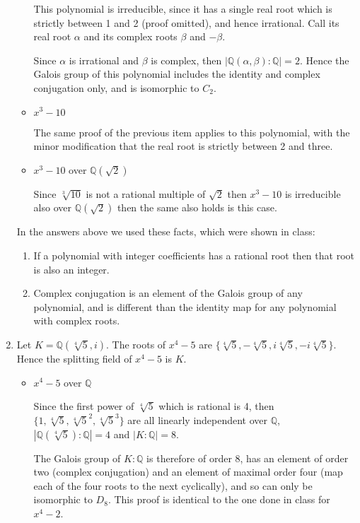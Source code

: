 \documentclass[11pt]{article} \usepackage{amssymb}
\newcommand{\Q}{\mathbb Q}
\begin{document}
\begin{enumerate}
\begin{itemize}
      This polynomial is irreducible, since it has a single real root which
      is strictly between 1 and 2 (proof omitted), and hence irrational. 
      Call its real root
      $\alpha$ and its complex roots $\beta$ and $-\beta$. 

      Since $\alpha$ is irrational and $\beta$ is complex, then 
      $|\Q(\alpha,\beta):\Q|=2$. Hence the Galois group of this polynomial
      includes the identity and complex conjugation only, and is isomorphic
      to $C_2$.
      
    \item $x^3-10$
      
      The same proof of the previous item applies to this polynomial, with the
      minor modification that the real root is strictly between 2 and three.

    \item $x^3-10$ over $\Q(\sqrt{2})$

      Since $\sqrt[3]{10}$ is not a rational multiple of $\sqrt{2}$ then
      $x^3-10$ is irreducible also over $\Q(\sqrt{2})$ then the same
      also holds is this case.

    \end{itemize}
    In the answers above we used these facts, which were shown in class:
    \begin{enumerate}
    \item If a 
      polynomial with integer coefficients has a rational root then that root
      is also an integer.
    \item Complex conjugation is an element of the Galois group of any 
      polynomial, and is different than the identity map for any polynomial
      with complex roots.
    \end{enumerate}
    
      
  \item
    Let $K=\Q(\sqrt[4]{5}, i)$.
    The roots of $x^4-5$ are 
    $\{\sqrt[4]{5},-\sqrt[4]{5}, i\sqrt[4]{5},-i\sqrt[4]{5}\}$.
    Hence the splitting field of $x^4-5$ is $K$.

    \begin{itemize}
    \item $x^4-5$ over $\Q$

      Since the first 
      power of $\sqrt[4]{5}$ which is rational is 4, then 
      $\{1,\sqrt[4]{5}, \sqrt[4]{5}^2, \sqrt[4]{5}^3\}$ are all linearly
      independent over $\Q$, $|\Q(\sqrt[4]{5}):\Q|=4$ and 
      $|K:\Q|=8$.

      The Galois group of $K:\Q$ is therefore of order 8, has an element of
      order two (complex conjugation) and an element of maximal order four (map
      each of the four roots to the next cyclically), and so can only be 
      isomorphic to $D_8$. This proof is identical to the one done in class
      for $x^4-2$.
      

\end{itemize}
\end{enumerate}
\end{document}
